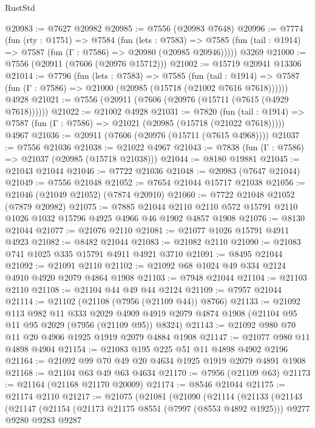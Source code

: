 \begin{lexlean}{RustStd}
\begin{coremodule}
{\begin{coremodule}
{{{{{{{{{{{{{{{{{{{{{{{{{{{{{{{{{{{{{{{{{{{@20983 := @7627 @20982
@20985 := @7556 (@20983 @7648)
@20996 := @7774
    (fun (rty : @1751) =>
    @7584
      (fun (lets : @7583) =>
      @7585 (fun (tail : @1914) => @7587 (fun (Γ : @7586) => @20980 (@20985 @20946)))))
    @3269
@21000 := @7556 (@20911 (@7606 (@20976 @15712)))
@21002 := @15719 @20941 @13306
@21014 := @7796
    (fun (lets : @7583) =>
    @7585
      (fun (tail : @1914) =>
      @7587 (fun (Γ : @7586) => @21000 (@20985 (@15718 (@21002 @7616 @7618))))))
    @4928
@21021 := @7556 (@20911 (@7606 (@20976 (@15711 (@7615 (@4929 @7618))))))
@21022 := @21002 @4928
@21031 := @7820
    (fun (tail : @1914) => @7587 (fun (Γ : @7586) => @21021 (@20985 (@15718 (@21022 @7618)))))
    @4967
@21036 := @20911 (@7606 (@20976 (@15711 (@7615 @4968))))
@21037 := @7556 @21036
@21038 := @21022 @4967
@21043 := @7838 (fun (Γ : @7586) => @21037 (@20985 (@15718 @21038)))
@21044 := @8180 @19881
@21045 := @21043 @21044
@21046 := @7722 @21036
@21048 := @20983 (@7647 @21044)
@21049 := @7556 @21048
@21052 := @7654 @21044 @15717 @21038
@21056 := @21046 (@21049 @21052) (@7874 @20910)
@21060 := @7722 @21048 @21052 (@7879 @20982)
@21075 := @7885
    @21044
    @2110
    @2110
    @572
    @15791
    @2110
    @1026
    @1032
    @15796
    @4925
    @4966
    @46
    @1902
    @4857
    @1908
@21076 := @8130 @21044
@21077 := @21076 @2110
@21081 := @21077 @1026 @15791 @4911 @4923
@21082 := @8482 @21044
@21083 := @21082 @2110
@21090 := @21083 @741 @1025 @335 @15791 @4911 @4921 @3710
@21091 := @8495 @21044
@21092 := @21091 @2110
@21102 := @21092 @68 @1024 @49 @334 @2124 @4910 @4920 @2079 @4864 @1908
@21103 := @7948 @21044
@21104 := @21103 @2110
@21108 := @21104 @44 @49 @44 @2124
@21109 := @7957 @21044
@21114 := @21102 (@21108 (@7956 (@21109 @44)) @8766)
@21133 := @21092
    @113
    @982
    @11
    @333
    @2029
    @4909
    @4919
    @2079
    @4874
    @1908
    (@21104 @95 @11 @95 @2029 (@7956 (@21109 @95)) @8324)
@21143 := @21092 @980 @70 @11 @20 @4906 @1925 @1919 @2079 @4884 @1908
@21147 := @21077 @980 @11 @4898 @4904
@21154 := @21083 @195 @225 @51 @11 @4898 @4902 @2196
@21164 := @21092 @99 @70 @49 @20 @4634 @1925 @1919 @2079 @4891 @1908
@21168 := @21104 @63 @49 @63 @4634
@21170 := @7956 (@21109 @63)
@21173 := @21164 (@21168 @21170 @20009)
@21174 := @8546 @21044
@21175 := @21174 @2110
@21217 := @21075
    (@21081
      (@21090
        (@21114
          (@21133
            (@21143
              (@21147
                (@21154
                  (@21173 @21175 @8551 (@7997 (@8553 @4892 @1925)))
                  @9277
                  @9280
                  @9283
                  @9287
}}}}}}}}}}}}}}}}}}}}}}}}}}}}}}}}}}}}}}}}}}}
\end{coremodule}}
\end{coremodule}
\end{lexlean}
